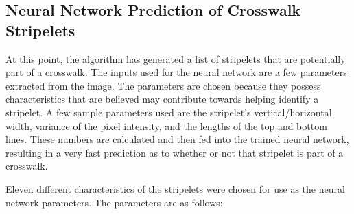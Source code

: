 \documentclass[12pt]{ucthesis}
\begin{document}
\subsection{Neural Network Prediction of Crosswalk Stripelets}


At this point, the algorithm has generated a list of stripelets that are potentially part of a crosswalk. The inputs used for the neural network are a few parameters extracted from the image. The parameters are chosen because they possess characteristics that are believed may contribute towards helping identify a stripelet. A few sample parameters used are the stripelet's vertical/horizontal width, variance of the pixel intensity, and the lengths of the top and bottom lines. These numbers are calculated and then fed into the trained neural network, resulting in a very fast prediction as to whether or not that stripelet is part of a crosswalk.


Eleven different characteristics of the stripelets were chosen for use as the neural network parameters. The parameters are as follows:
\end{document}
